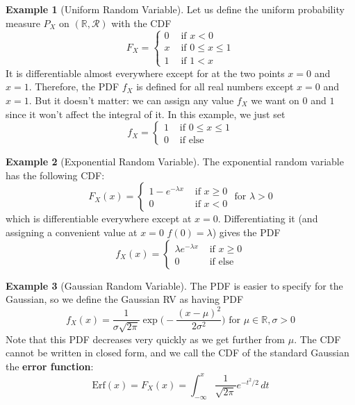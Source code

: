 \documentclass{article}
\theoremstyle{definition}
\newtheorem{example}{Example}[section]
\theoremstyle{remark}
\theoremstyle{definition}
\begin{document}
\begin{example}[Uniform Random Variable]
Let us define the uniform probability measure $P_X$ on $(\mathbb{R}, \mathcal{R})$ with the CDF 
\[F_X = \begin{cases} 0 & \text{ if } x < 0 \\
x & \text{ if } 0 \leq x \leq 1 \\
1 & \text{ if } 1 < x \end{cases}\]
It is differentiable almost everywhere except for at the two points $x = 0$ and $x = 1$. Therefore, the PDF $f_X$ is defined for all real numbers except $x = 0$ and $x = 1$. But it doesn't matter: we can assign any value $f_X$ we want on $0$ and $1$ since it won't affect the integral of it. In this example, we just set 
\[f_X = \begin{cases} 1 & \text{ if } 0 \leq x \leq 1 \\
0 & \text{ if else} \end{cases} \]
\end{example}

\begin{example}[Exponential Random Variable]
The exponential random variable has the following CDF: 
\[F_X (x) = \begin{cases} 1 - e^{-\lambda x} & \text{ if } x \geq 0 \\ 0 & \text{ if } x < 0 \end{cases} \text{ for } \lambda > 0\]
which is differentiable everywhere except at $x = 0$. Differentiating it (and assigning a convenient value at $x = 0$ $f(0) = \lambda$) gives the PDF 
\[f_X (x) = \begin{cases} \lambda e^{-\lambda x} & \text{ if } x \geq 0 \\ 0 & \text{ if else} \end{cases}\]
\end{example}

\begin{example}[Gaussian Random Variable]
The PDF is easier to specify for the Gaussian, so we define the Gaussian RV as having PDF 
\[f_X (x) = \frac{1}{\sigma \sqrt{2 \pi}} \exp \bigg( -\frac{(x - \mu)^2}{2 \sigma^2} \bigg) \text{ for } \mu \in \mathbb{R}, \sigma > 0\]
Note that this PDF decreases very quickly as we get further from $\mu$. The CDF cannot be written in closed form, and we call the CDF of the standard Gaussian the \textbf{error function}: 
\[\mathrm{Erf}(x) = F_X (x) = \int_{-\infty}^x \frac{1}{\sqrt{2 \pi}} e^{- t^2 / 2} \, dt\]
\end{example}
\end{document}
